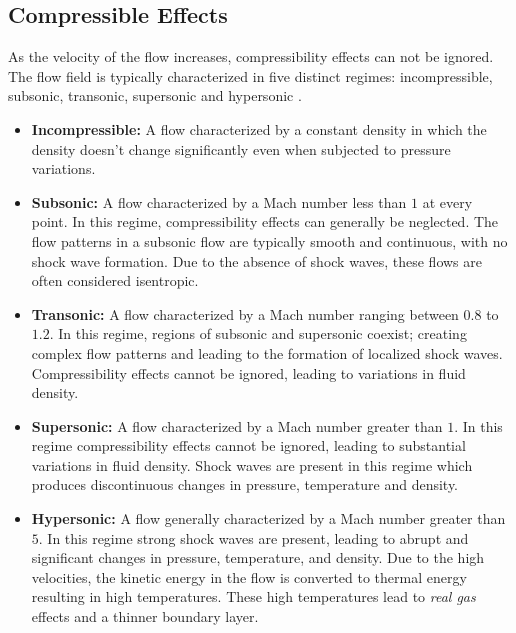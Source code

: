         \subsection{Compressible Effects}
        As the velocity of the flow increases, compressibility effects can
        not be ignored. The flow field is typically characterized in five
        distinct regimes: incompressible, subsonic, transonic, supersonic and
        hypersonic \cite{Wilcox2010}.
        \begin{itemize}
            \item \textbf{Incompressible:} A flow characterized by a constant
                density in which the density doesn't change significantly even
                when subjected to pressure variations.
            \item \textbf{Subsonic:} A flow characterized by a Mach number less
                than $1$ at every point. In this regime, compressibility
                effects can generally be neglected. The flow patterns in a
                subsonic flow are typically smooth and continuous, with no
                shock wave formation. Due to the absence of shock waves, these
                flows are often considered isentropic.
            \item \textbf{Transonic:} A flow characterized by a Mach number
                ranging between $0.8$ to $1.2$. In this regime, regions of subsonic and
                supersonic coexist; creating complex flow patterns and leading
                to the formation of localized shock waves. Compressibility
                effects cannot be ignored, leading to variations in fluid
                density.
            \item \textbf{Supersonic:} A flow characterized by a Mach number
                greater than $1$. In this regime compressibility effects
                cannot be ignored, leading to substantial variations in fluid
                density. Shock waves are present in this regime which produces
                discontinuous changes in pressure, temperature and density. 
            \item \textbf{Hypersonic:} A flow generally characterized by a Mach number
                greater than $5$. In this regime strong shock waves are
                present, leading to abrupt and significant changes in pressure,
                temperature, and density. Due to the high velocities, the
                kinetic energy in the flow is converted to thermal energy
                resulting in high temperatures. These high temperatures lead to
                \textit{real gas} effects and a thinner boundary layer.
        \end{itemize}

